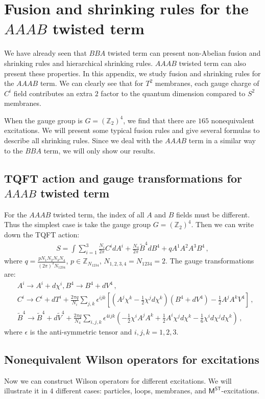 \documentclass[11pt,nofootinbib,preprint]{revtex4-1}
\begin{document}
\section{Fusion and shrinking rules for the $AAAB$ twisted term\label{ap4}}
We have already seen that $BBA$ twisted term can present non-Abelian fusion and shrinking rules and hierarchical shrinking rules. $AAAB$ twisted term can also present these properties. In this appendix, we study fusion and shrinking rules for the $AAAB$ term. We can clearly see that for $T^2$ membranes, each gauge charge of $C^i$ field contributes an extra $2$ factor to the quantum dimension compared to $S^2$ membranes.

When the gauge group is $G={\left( \mathbb{Z} _{2} \right)}^4$, we find that there are $165$ nonequivalent excitations. We will present  some typical fusion rules and give several formulas to describe all shrinking rules. Since we deal with the $AAAB$ term in a similar way to the $BBA$ term, we will only show our results. 
\subsection{TQFT action and gauge transformations for $AAAB$ twisted term}
For the $AAAB$ twisted term, the index of all $A$ and $B$ fields must be different. Thus the simplest case is take the gauge group $G={\left( \mathbb{Z} _{2} \right)}^4$. Then we can write down the TQFT action:
\begin{align}
	S=\int{\sum_{i=1}^3{\frac{N_i}{2\pi}C^idA^i}+}\frac{N_4}{2\pi}\tilde{B}^4dB^4+qA^1A^2A^3B^4\,,
\end{align}
where $q=\frac{pN_1N_2N_3N_4}{\left( 2\pi \right) ^3N_{1234}}$, $p\in \mathbb{Z} _{N_{1234}}$, $N_{1,2,3,4}=N_{1234}=2$. The gauge transformations are:
\begin{align}
	&A^i\rightarrow A^i+d\chi ^i,B^4\rightarrow B^4+dV^4\,,
	\label{eq21}
	\\
	&C^i\rightarrow C^i+dT^i+\frac{2\pi q}{N_i}\sum_{j,k}{\epsilon ^{ijk}}\left[ \left( A^j\chi ^k-\frac{1}{2}\chi ^jd\chi ^k \right) \left( B^4+dV^4 \right) -\frac{1}{2}A^jA^kV^4 \right] \,,
	\\
	&\tilde{B}^4\rightarrow \tilde{B}^4+d\tilde{V}^4+\frac{2\pi q}{N_4}\sum_{i,j,k}{\epsilon ^{4ijk}}\left( -\frac{1}{2}\chi ^iA^jA^k+\frac{1}{2}A^i\chi ^jd\chi ^k-\frac{1}{6}\chi ^id\chi ^jd\chi ^k \right) \,,
\end{align}
where $\epsilon$ is the anti-symmetric tensor and $i,j,k=1,2,3$.
\subsection{Nonequivalent Wilson operators for excitations}
Now we can construct Wilson operators for different excitations. We will illustrate it in $4$ different cases: particles, loops, membranes, and $\mathsf{M^{ST}}$-excitations.
\end{document}

